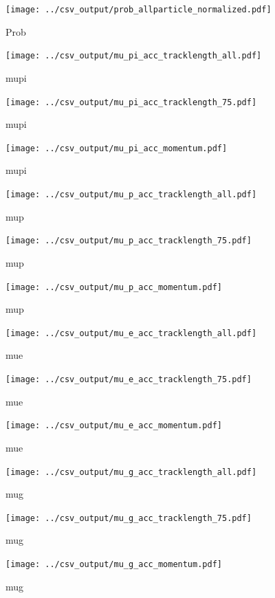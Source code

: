 \begin{figure}[htp]
\centering
\texttt{[image: ../csv\_output/prob\_allparticle\_normalized.pdf]}
\caption{Prob}
\label{fig:prob}
\end{figure}

\begin{figure}[htp]
\centering
\texttt{[image: ../csv\_output/mu\_pi\_acc\_tracklength\_all.pdf]}
\caption{mupi}
\label{fig:mu_pi}
\end{figure}

\begin{figure}[htp]
\centering
\texttt{[image: ../csv\_output/mu\_pi\_acc\_tracklength\_75.pdf]}
\caption{mupi}
\label{fig:mu_pi}
\end{figure}

\begin{figure}[htp]
\centering
\texttt{[image: ../csv\_output/mu\_pi\_acc\_momentum.pdf]}
\caption{mupi}
\label{fig:mu_pi}
\end{figure}

\begin{figure}[htp]
\centering
\texttt{[image: ../csv\_output/mu\_p\_acc\_tracklength\_all.pdf]}
\caption{mup}
\label{fig:mu_p}
\end{figure}

\begin{figure}[htp]
\centering
\texttt{[image: ../csv\_output/mu\_p\_acc\_tracklength\_75.pdf]}
\caption{mup}
\label{fig:mu_p}
\end{figure}

\begin{figure}[htp]
\centering
\texttt{[image: ../csv\_output/mu\_p\_acc\_momentum.pdf]}
\caption{mup}
\label{fig:mu_p}
\end{figure}

\begin{figure}[htp]
\centering
\texttt{[image: ../csv\_output/mu\_e\_acc\_tracklength\_all.pdf]}
\caption{mue}
\label{fig:mu_e}
\end{figure}

\begin{figure}[htp]
\centering
\texttt{[image: ../csv\_output/mu\_e\_acc\_tracklength\_75.pdf]}
\caption{mue}
\label{fig:mu_e}
\end{figure}

\begin{figure}[htp]
\centering
\texttt{[image: ../csv\_output/mu\_e\_acc\_momentum.pdf]}
\caption{mue}
\label{fig:mu_e}
\end{figure}

\begin{figure}[htp]
\centering
\texttt{[image: ../csv\_output/mu\_g\_acc\_tracklength\_all.pdf]}
\caption{mug}
\label{fig:mu_g}
\end{figure}

\begin{figure}[htp]
\centering
\texttt{[image: ../csv\_output/mu\_g\_acc\_tracklength\_75.pdf]}
\caption{mug}
\label{fig:mu_g}
\end{figure}

\begin{figure}[htp]
\centering
\texttt{[image: ../csv\_output/mu\_g\_acc\_momentum.pdf]}
\caption{mug}
\label{fig:mu_g}
\end{figure}

